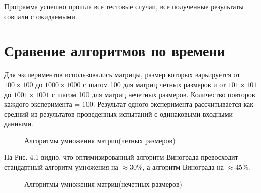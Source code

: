 \documentclass[a4paper,12pt]{report}
\begin{document}
Программа успешно прошла все тестовые случаи, все полученные результаты совпали с ожидаемыми.

\section{Сравение алгоритмов по времени}
\hspace{0.6cm}Для экспериментов использовались матрицы, размер которых варьируется от $100 \times 100$ до $1000 \times 1000$ с шагом 100 для матриц четных размеров и от $101 \times 101$ до $1001 \times 1001$ с шагом 100 для матриц нечетных размеров. 
    Количество повторов каждого эксперимента = 100. Результат одного эксперимента рассчитывается как средний из результатов проведенных испытаний с одинаковыми входными данными.
    

\begin{figure}[ht!]
\begin{center}
\caption{Алгоритмы умножения матриц(четных размеров)}
\end{center}
\end{figure}

На Рис. 4.1 видно, что оптимизированный алгоритм Винограда превосходит стандартный алгоритм умножения на $\approx 30\%$, а алгоритм Винограда на $\approx45\%$.

\begin{figure}[ht!]
\begin{center}
\caption{Алгоритмы умножения матриц(нечетных размеров)}
\end{center}
\end{figure}
\end{document}
